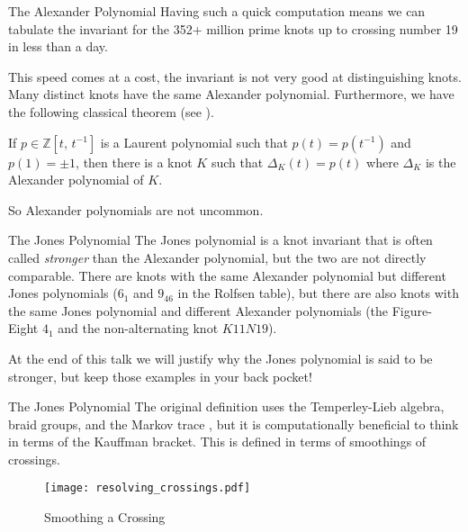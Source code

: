 \documentclass{beamer}
\begin{document}
    \begin{frame}{The Alexander Polynomial}
        Having such a quick computation means we can tabulate the invariant
        for the 352+ million prime knots up to crossing number 19 in less than
        a day.
        \par\hfill\par
        This speed comes at a cost, the invariant is not very good at
        distinguishing knots. Many distinct knots have the same Alexander
        polynomial. Furthermore, we have the following classical theorem
        (see \cite{KawauchiSurveyKnotTheory1996}).
        \begin{theorem}
            If $p\in\mathbb{Z}[t,\,t^{-1}]$ is a Laurent polynomial such that
            $p(t)=p(t^{-1})$ and $p(1)=\pm{1}$, then there is a knot $K$
            such that $\Delta_{K}(t)=p(t)$ where $\Delta_{K}$ is the
            Alexander polynomial of $K$.
        \end{theorem}
        So Alexander polynomials are not uncommon.
    \end{frame}
    \begin{frame}{The Jones Polynomial}
        The Jones polynomial is a knot invariant that is often called
        \textit{stronger} than the Alexander polynomial, but the two are not
        directly comparable. There are knots with the same Alexander polynomial
        but different Jones polynomials ($6_{1}$ and $9_{46}$ in the Rolfsen
        table), but there are also knots with the
        same Jones polynomial and different Alexander polynomials
        (the Figure-Eight $4_{1}$ and the non-alternating knot
        $K11N19$).
        \par\hfill\par
        At the end of this talk we will justify why the Jones polynomial is
        said to be stronger, but keep those examples in your back pocket!
    \end{frame}
    \begin{frame}{The Jones Polynomial}
        The original definition uses the Temperley-Lieb algebra, braid groups,
        and the Markov trace \cite{jonesfordummyvjones}, but it is
        computationally
        beneficial to think in terms of the Kauffman bracket. This is defined
        in terms of smoothings of crossings.
        \par\hfill\par
        \begin{figure}
            \centering
            \texttt{[image: resolving\_crossings.pdf]}
            \caption{Smoothing a Crossing}
        \end{figure}
    \end{frame}
\end{document}
